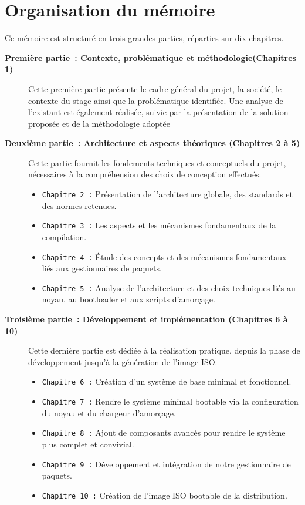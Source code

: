 \clearpage




\section*{Organisation du mémoire}

Ce mémoire est structuré en trois grandes parties, réparties sur dix chapitres.

\medskip

\begin{description}
  \item[\textbf{Première partie : Contexte, problématique et méthodologie(Chapitres 1)}]  
 Cette première partie présente le cadre général du projet, la société, le contexte du stage ainsi que la problématique identifiée. Une analyse de l’existant est également réalisée, suivie par la présentation de la solution proposée et de la méthodologie adoptée
\bigbreak
  \item[\textbf{Deuxième partie : Architecture et aspects théoriques (Chapitres 2 à 5)\\}]  
  Cette partie fournit les fondements techniques et conceptuels du projet, nécessaires à la compréhension des choix de conception effectués.
  \begin{itemize}
    \item \texttt{Chapitre 2 :} Présentation de l’architecture globale, des standards et des normes retenues.
    \item \texttt{Chapitre 3 :} Les aspects et les mécanismes fondamentaux de la compilation.
    \item \texttt{Chapitre 4 :} Étude des concepts et des mécanismes fondamentaux liés aux gestionnaires de paquets.
    \item \texttt{Chapitre 5 :} Analyse de l’architecture et des choix techniques liés au noyau, au bootloader et aux scripts d’amorçage.
  \end{itemize}
  
\bigbreak
  \item[\textbf{Troisième partie : Développement et implémentation (Chapitres 6 à 10)\\}]  
  Cette dernière partie est dédiée à la réalisation pratique, depuis la phase de développement jusqu’à la génération de l’image ISO.
  \begin{itemize}
    \item \texttt{Chapitre 6 :} Création d’un système de base minimal et fonctionnel.
    \item \texttt{Chapitre 7 :} Rendre le système minimal bootable via la configuration du noyau et du chargeur d’amorçage.
    \item \texttt{Chapitre 8 :} Ajout de composants avancés pour rendre le système plus complet et convivial.
    \item \texttt{Chapitre 9 :} Développement et intégration de notre  gestionnaire de paquets.
    \item \texttt{Chapitre 10 :} Création de l’image ISO bootable de la distribution.
  \end{itemize}
\end{description}

\medskip




